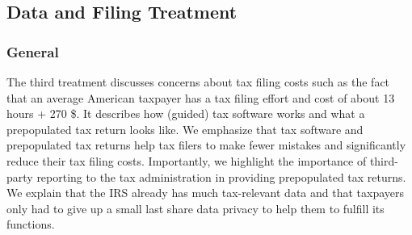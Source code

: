 \documentclass[11pt]{article}
\begin{document}
%

\subsection{Data and Filing Treatment}
\subsubsection*{General}
The third treatment discusses concerns about tax filing costs such as the fact that an average American taxpayer has a tax filing effort and cost of about 13 hours + 270 \$. It describes how (guided) tax software works and what a prepopulated tax return looks like. We emphasize that tax software and prepopulated tax returns help tax filers to make fewer mistakes and significantly reduce their tax filing costs. Importantly, we highlight the importance of third-party reporting to the tax administration in providing prepopulated tax returns. We explain that the IRS already has much tax-relevant data and that taxpayers only had to give up a small last share data privacy to help them to fulfill its functions. 
\end{document}
